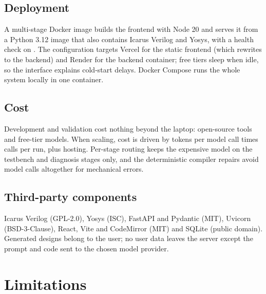 \documentclass[11pt,a4paper]{article}
\newcommand{\code}[1]{\texttt{\detokenize{#1}}}
\begin{document}
\subsection{Deployment}
A multi-stage Docker image builds the frontend with Node 20 and serves it from a Python 3.12 image that also contains Icarus Verilog and Yosys, with a health check on \code{/health}. The configuration targets Vercel for the static frontend (which rewrites \code{/api} to the backend) and Render for the backend container; free tiers sleep when idle, so the interface explains cold-start delays. Docker Compose runs the whole system locally in one container.

\subsection{Cost}
Development and validation cost nothing beyond the laptop: open-source tools and free-tier models. When scaling, cost is driven by tokens per model call times calls per run, plus hosting. Per-stage routing keeps the expensive model on the testbench and diagnosis stages only, and the deterministic compiler repairs avoid model calls altogether for mechanical errors.

\subsection{Third-party components}
Icarus Verilog (GPL-2.0), Yosys (ISC), FastAPI and Pydantic (MIT), Uvicorn (BSD-3-Clause), React, Vite and CodeMirror (MIT) and SQLite (public domain). Generated designs belong to the user; no user data leaves the server except the prompt and code sent to the chosen model provider.

\section{Limitations}
\label{sec:limits}
\end{document}
